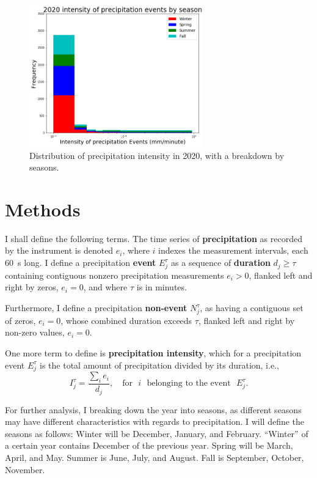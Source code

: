 \documentclass[11pt]{report}
\newcommand{\fracd}[2]{\frac{\displaystyle{#1}}{\displaystyle{#2}}}
\begin{document}
\begin{figure}[b]
	\centering
	\includegraphics[width=0.675\textwidth]{Figures/inten2020.png}
	\caption[Intensity histogram for 2020 broken down by season]
	{\label{i2020} Distribution of precipitation intensity in
		2020, with a breakdown by seasons.}
\end{figure}
\clearpage


\section{Methods \label{sec:methods}}

I shall define the following terms. The time series of
\textbf{precipitation} as recorded by the instrument is denoted $e_i$,
where $i$ indexes the measurement intervals, each 60~s long. I define
a precipitation \textbf{event} $E_j^\tau $ as a sequence of
\textbf{duration} $d_j\ge \tau$ containing contiguous nonzero
precipitation measurements $e_i>0$, flanked left and right by zeros,
$e_i=0$, and where $\tau$ is in minutes.

Furthermore, I define a precipitation \textbf{non-event} $N_j^\tau$,
  as having a contiguous set of zeros, $e_i=0$, whose combined duration
  exceeds $\tau$, flanked left and right by non-zero values, $e_i=0$.

One more term to define is \textbf{precipitation intensity}, which for
a precipitation event $E_j^\tau$ is the total amount of precipitation
divided by its duration, i.e., 
\begin{equation}
I_j^\tau = \fracd{\sum_i e_i }{d_j} ,
\quad
\mbox{for}\,\,\,\, i\,\,\,\, \mbox{belonging to the event}\,\,\,\, E_j^\tau
.
\end{equation}



For further analysis, I breaking down the year into seasons, as
different seasons may have different characteristics with regards to
precipitation. I will define the seasons as follows: Winter will be
December, January, and February. ``Winter'' of a certain year contains
December of the previous year.  Spring will be March, April, and
May. Summer is June, July, and August. Fall is September, October,
November.
\end{document}

